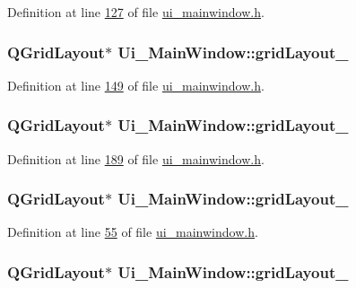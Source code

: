 Definition at line \hyperlink{a00052_source_l00127}{127} of file \hyperlink{a00052_source}{ui\+\_\+mainwindow.\+h}.

\hypertarget{a00027_adbbd44debcfc24db144006951bf7b3e1}{
\subsubsection[{grid\+Layout\+\_\+12}]{\setlength{\rightskip}{0pt plus 5cm}Q\+Grid\+Layout$\ast$ Ui\+\_\+\+Main\+Window\+::grid\+Layout\+\_}}\label{a00027_adbbd44debcfc24db144006951bf7b3e1}


Definition at line \hyperlink{a00052_source_l00149}{149} of file \hyperlink{a00052_source}{ui\+\_\+mainwindow.\+h}.

\hypertarget{a00027_aa9ccdb529e4396a7c1d52c07add8e4ab}{
\subsubsection[{grid\+Layout\+\_\+153}]{\setlength{\rightskip}{0pt plus 5cm}Q\+Grid\+Layout$\ast$ Ui\+\_\+\+Main\+Window\+::grid\+Layout\+\_}}\label{a00027_aa9ccdb529e4396a7c1d52c07add8e4ab}


Definition at line \hyperlink{a00052_source_l00189}{189} of file \hyperlink{a00052_source}{ui\+\_\+mainwindow.\+h}.

\hypertarget{a00027_a6b2a0c5f7e8ff2a87134908dd770d2d2}{
\subsubsection[{grid\+Layout\+\_\+2}]{\setlength{\rightskip}{0pt plus 5cm}Q\+Grid\+Layout$\ast$ Ui\+\_\+\+Main\+Window\+::grid\+Layout\+\_}}\label{a00027_a6b2a0c5f7e8ff2a87134908dd770d2d2}


Definition at line \hyperlink{a00052_source_l00055}{55} of file \hyperlink{a00052_source}{ui\+\_\+mainwindow.\+h}.

\hypertarget{a00027_af42ea7d4c2e893181caad21e28166932}{
\subsubsection[{grid\+Layout\+\_\+3}]{\setlength{\rightskip}{0pt plus 5cm}Q\+Grid\+Layout$\ast$ Ui\+\_\+\+Main\+Window\+::grid\+Layout\+\_}}\label{a00027_af42ea7d4c2e893181caad21e28166932}


